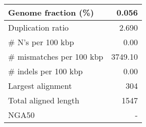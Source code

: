 \documentclass[12pt,a4paper]{article}
\begin{document}
\begin{table}[ht]
\begin{center}
\begin{tabular}{|l*{1}{|r}|}
Genome fraction (\%) & 0.056 \\ \hline
Duplication ratio & 2.690 \\ \hline
\# N's per 100 kbp & 0.00 \\ \hline
\# mismatches per 100 kbp & 3749.10 \\ \hline
\# indels per 100 kbp & 0.00 \\ \hline
Largest alignment & 304 \\ \hline
Total aligned length & 1547 \\ \hline
NGA50 & - \\ \hline
\end{tabular}
\end{center}
\end{table}
\end{document}
